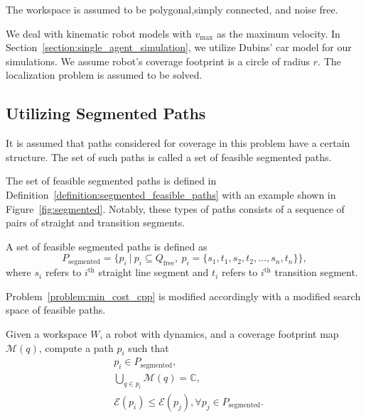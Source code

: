 \documentclass[../main.tex]{subfiles}
\begin{document}
\begin{assumption}
	The workspace is assumed to be polygonal,simply connected, and noise free. 
\end{assumption}

\begin{assumption}
	We deal with kinematic robot models with $v_{\max}$ as the maximum velocity. In Section~\ref{section:single_agent_simulation}, we utilize Dubins' car model for our simulations. We assume robot's coverage footprint is a circle of radius $r$. The localization problem is assumed to be solved. 
\end{assumption}


\subsection{Utilizing Segmented Paths}
\label{subsection:conversion_to_segmented}

\begin{assumption}
It is assumed that paths considered for coverage in this problem have a certain structure. The set of such paths is called a set of feasible segmented paths.
\end{assumption}

The set of feasible segmented paths is defined in Definition~\ref{definition:segmented_feasible_paths} with an example shown in Figure~\ref{fig:segmented}. Notably, these types of paths consists of a sequence of pairs of straight and transition segments.
\begin{definition}
\label{definition:segmented_feasible_paths}
A set of feasible segmented paths is defined as
	\begin{equation}
		P_{\text{segmented}}=\{p_i\ |\ p_i\subseteq Q_{\text{free}},\  p_i=\{s_1,t_1,s_2,t_2,\dots,s_n,t_n\}\},
	\end{equation}
	where $s_i$ refers to $i^{\text{th}}$ straight line segment and $t_i$ refers to $i^{\text{th}}$ transition segment.
\end{definition}

Problem~\ref{problem:min_cost_cpp} is modified accordingly with a modified search space of feasible paths.
\begin{problem}
\label{problem:min_cost_cpp_with_lines}
	Given a workspace $W$, a robot with dynamics, and a coverage footprint map $\mathcal{M}(q)$, compute a path $p_i$ such that
	\begin{equation}
	\label{condition:full_coverage_2}
	\begin{aligned}
		& p_i\in P_{\text{segmented}},\\
		& \bigcup_{q\in p_i}\mathcal{M}(q)=\mathbb{C},\\
		& \mathcal{E}(p_i)\leq\mathcal{E}(p_j), \forall p_j\in P_{\text{segmented}}.
	\end{aligned}
	\end{equation}
\end{problem}
\end{document}
